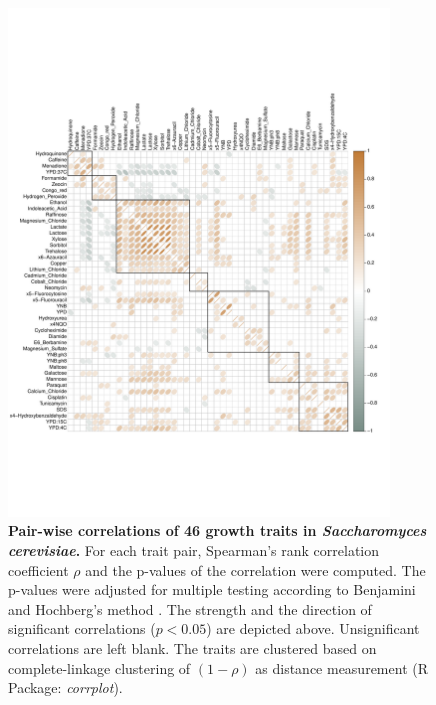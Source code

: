 \begin{figure}[hbtp]
	\centering
	\includegraphics[trim = 0mm 80mm 10mm 80mm, clip, width=0.9\textwidth]{Chapter1/Figures/20170125_correlation_pheno_noNA.pdf}
	\caption{\textbf{Pair-wise correlations of 46 growth traits in \emph{Saccharomyces cerevisiae}.} For each trait pair, Spearman's rank correlation coefficient \(\rho\) and the p-values of the correlation were computed. The p-values were adjusted for multiple testing according to Benjamini and Hochberg's method \citep{Benjamini1995}. The strength and the direction of significant correlations (\(p < 0.05\)) are depicted above. Unsignificant correlations are left blank. The traits are clustered based on complete-linkage clustering of \((1-\rho)\) as distance measurement (R Package: \emph{corrplot}).}
 	\label{fig:traitcorrelations}
\end{figure}
 	

